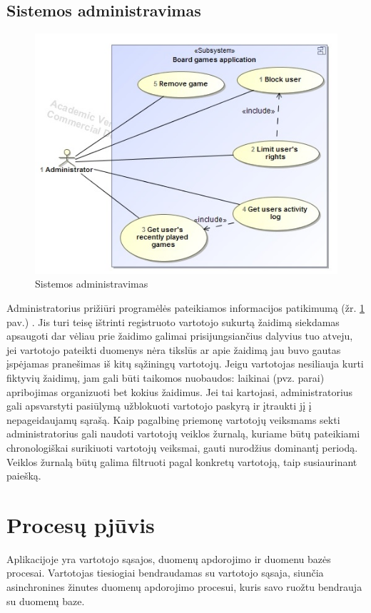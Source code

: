 \documentclass{VUMIFPSkursinis}
\begin{document}
	\subsection{Sistemos administravimas}
		\begin{figure}[H]
			\centering
			\includegraphics[scale=0.6]{img/UzduociuDiagrama3}
			\caption{Sistemos administravimas}
			\label{img:UzduociuDiagrama3}
		\end{figure}
		Administratorius prižiūri programėlės pateikiamos informacijos patikimumą (žr. \ref{img:UzduociuDiagrama3} pav.) . Jis turi teisę ištrinti registruoto vartotojo sukurtą žaidimą siekdamas apsaugoti dar vėliau prie žaidimo galimai prisijungsiančius dalyvius tuo atveju, jei vartotojo pateikti duomenys nėra tikslūs ar apie žaidimą jau buvo gautas įspėjamas pranešimas iš kitų sąžiningų vartotojų. Jeigu vartotojas nesiliauja kurti fiktyvių žaidimų, jam gali būti taikomos nuobaudos: laikinai (pvz. parai) apribojimas organizuoti bet kokius žaidimus. Jei tai kartojasi, administratorius gali apsvarstyti pasiūlymą užblokuoti vartotojo paskyrą ir įtraukti jį į nepageidaujamų sąrašą. Kaip pagalbinę priemonę vartotojų veiksmams sekti administratorius gali naudoti vartotojų veiklos žurnalą, kuriame būtų pateikiami chronologiškai surikiuoti vartotojų veiksmai, gauti nurodžius dominantį periodą. Veiklos žurnalą būtų galima filtruoti pagal konkretų vartotoją, taip susiaurinant paiešką.		


\section{Procesų pjūvis}
Aplikacijoje yra vartotojo sąsajos, duomenų apdorojimo ir duomenu bazės procesai. 
Vartotojas tiesiogiai bendraudamas su vartotojo sąsaja, siunčia asinchronines 
žinutes duomenų apdorojimo procesui, kuris savo ruožtu bendrauja su duomenų baze.
\end{document}
